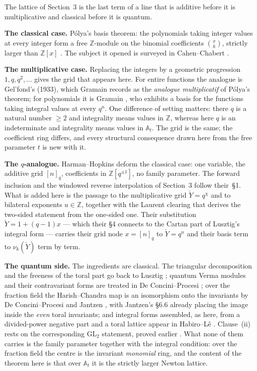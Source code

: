 \documentclass[11pt]{article}
\newcommand{\At}{\mathbb{A}_t}
\newcommand{\Yc}{\check Y}
\newcommand{\Z}{\mathbb Z}
\begin{document}
\noindent
The lattice of Section~3 is the last term of a line that is additive before it is multiplicative
and classical before it is quantum.

\medskip\noindent
\textbf{The classical case.} P\'olya's basis theorem: the polynomials taking integer values
at every integer form a free $\Z$-module on the binomial coefficients $\binom{x}{k}$, strictly
larger than $\Z[x]$ \cite[Prop.~1.1]{HarmanHopkins}. The subject it opened is surveyed in
Cahen--Chabert \cite{CahenChabert}.

\medskip\noindent
\textbf{The multiplicative case.} Replacing the integers by a geometric progression $1,q,q^2,\dots$
gives the grid that appears here. For entire functions the analogue is Gel'fond's (1933), which
Gramain records as the \emph{analogue multiplicatif} of P\'olya's theorem; for polynomials it is
Gramain \cite[Prop.~2.2]{Gramain}, who exhibits a basis for the functions taking integral values at
every $q^{n}$. One difference of setting matters: there $q$ is a natural number $\ge 2$ and
integrality means values in $\mathbb Z$, whereas here $q$ is an indeterminate and integrality means
values in $\At$. The grid is the same; the coefficient ring differs, and every structural
consequence drawn here from the free parameter $t$ is new with it.

\medskip\noindent
\textbf{The $q$-analogue.} Harman--Hopkins \cite[\S1, Props.~1.1--1.2]{HarmanHopkins} deform the
classical case: one variable, the additive grid $[n]_q$, coefficients in $\mathbb Z[q^{\pm1}]$, no
family parameter. The forward inclusion and the windowed reverse interpolation of Section~3 follow
their~\S1. What is added here is the passage to the multiplicative grid $\Yc=q^{\chi}$ and to
bilateral exponents $u\in\mathbb Z$, together with the Laurent clearing that derives the two-sided
statement from the one-sided one. Their substitution $\Yc=1+(q-1)x$ --- which their \S4 connects to
the Cartan part of Lusztig's integral form --- carries their grid node $x=[n]_q$ to $\Yc=q^{n}$ and
their basis term to $\nu_k(\Yc)$ term by term.

\medskip\noindent
\textbf{The quantum side.} The ingredients are classical. The triangular decomposition and the
freeness of the toral part go back to Lusztig \cite[\S3.2]{Lusztig}; quantum Verma modules and
their contravariant forms are treated in De Concini--Procesi \cite[\S\S17.1--17.4]{DCP}; over the
fraction field the Harish--Chandra map is an isomorphism onto the invariants by De Concini--Procesi
\cite[\S18.3]{DCP} and Jantzen \cite[Thm.~6.25 and \S6.26]{Jantzen}, with Jantzen's \S6.6 already
placing the image inside the \emph{even} toral invariants; and integral forms assembled, as here,
from a divided-power negative part and a toral lattice appear in Habiro--L\^e \cite[\S8G]{HabiroLe}.
Clause~(ii) rests on the corresponding $\mathrm{GL}_2$ statement, proved earlier
\cite{SandboxGL2}. What none of them carries is the family parameter together with the integral
condition: over the fraction field the centre is the invariant \emph{monomial} ring, and the
content of the theorem here is that over $\At$ it is the strictly larger Newton lattice.
\end{document}
